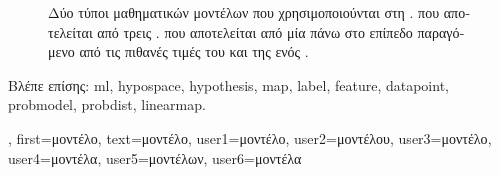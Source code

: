 {{\begin{figure}[H]
		{
		\caption{\foreignlanguage{greek}{Δύο τύποι μαθηματικών μοντέλων που χρησιμοποιούνται στη} . 
			  \foreignlanguage{greek}{που αποτελείται από τρεις} 
			.   
			\foreignlanguage{greek}{που αποτελείται από μία}  \foreignlanguage{greek}{πάνω στο επίπεδο 
			παραγόμενο από τις πιθανές τιμές του}  \foreignlanguage{greek}{και της}  
			\foreignlanguage{greek}{ενός} . \label{fig_model_dict}} }
		\end{figure}
		\foreignlanguage{greek}{Βλέπε επίσης:} \gls{ml}, \gls{hypospace}, \gls{hypothesis}, \gls{map}, \gls{label}, 
		\gls{feature}, \gls{datapoint}, \gls{probmodel}, \gls{probdist}, \gls{linearmap}.},
	first={\foreignlanguage{greek}{μοντέλο}},
	text={\foreignlanguage{greek}{μοντέλο}},
	user1={\foreignlanguage{greek}{μοντέλο}}, %
	user2={\foreignlanguage{greek}{μοντέλου}}, %
	user3={\foreignlanguage{greek}{μοντέλο}}, %
	user4={\foreignlanguage{greek}{μοντέλα}}, %
	user5={\foreignlanguage{greek}{μοντέλων}}, %
	user6={\foreignlanguage{greek}{μοντέλα}} %
}

